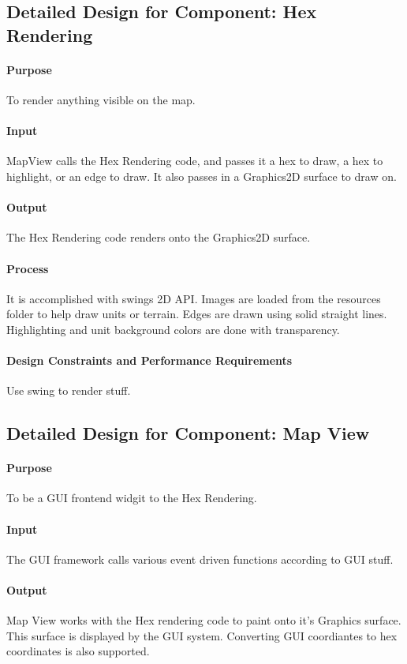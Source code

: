 \documentclass[12pt,a4paper,titlepage]{article}
\begin{document}
\subsection{Detailed Design for Component: Hex Rendering}
\paragraph{Purpose} To render anything visible on the map.
\paragraph{Input}
MapView calls the Hex Rendering code, and passes it a hex to draw, a hex to highlight,
or an edge to draw. It also passes in a Graphics2D surface to draw on.
\paragraph{Output}
The Hex Rendering code renders onto the Graphics2D surface.
\paragraph{Process}
It is accomplished with swings 2D API. Images are
loaded from the resources folder to help draw units or terrain. 
Edges are drawn using solid straight lines.
Highlighting and unit background colors are done with transparency.
\paragraph{Design Constraints and Performance Requirements}
Use swing to render stuff.

\subsection{Detailed Design for Component: Map View}
\paragraph{Purpose} To be a GUI frontend widgit to the Hex Rendering.
\paragraph{Input}
The GUI framework calls various event driven functions according to GUI stuff.
\paragraph{Output}
Map View works with the Hex rendering code to paint onto it's Graphics surface.
This surface is displayed by the GUI system.
Converting GUI coordiantes to hex coordinates is also supported.
\end{document}
